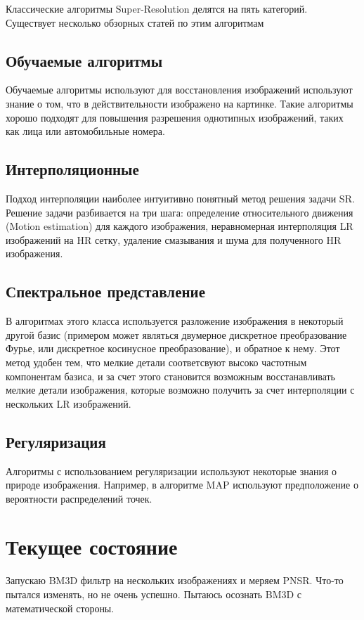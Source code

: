Классические алгоритмы Super-Resolution делятся на пять категорий.
Существует несколько обзорных статей по этим алгоритмам \cite{ParkS.C.2003,TianJ.2011}


\subsection{Обучаемые алгоритмы}

Обучаемые алгоритмы используют для восстановления изображений используют
знание о том, что в действительности изображено на картинке. Такие
алгоритмы хорошо подходят для повышения разрешения однотипных изображений,
таких как лица или автомобильные номера.


\subsection{Интерполяционные}

Подход интерполяции наиболее интуитивно понятный метод решения задачи
SR. Решение задачи разбивается на три шага: определение относительного
движения (Motion estimation) для каждого изображения, неравномерная
интерполяция LR изображений на HR сетку, удаление смазывания и шума
для полученного HR изображения.


\subsection{Спектральное представление}

В алгоритмах этого класса используется разложение изображения в некоторый
другой базис (примером может являться двумерное дискретное преобразование
Фурье, или дискретное косинусное преобразование), и обратное к нему.
Этот метод удобен тем, что мелкие детали соответсвуют высоко частотным
компонентам базиса, и за счет этого становится возможным восстанавливать
мелкие детали изображения, которые возможно получить за счет интерполяции
с нескольких LR изображений.


\subsection{Регуляризация}

Алгоритмы с использованием регуляризации используют некоторые знания
о природе изображения. Например, в алгоритме MAP используют предположение
о вероятности распределений точек.


\section{Текущее состояние}

Запускаю BM3D фильтр на нескольких изображениях и меряем PNSR. Что-то
пытался изменять, но не очень успешно. Пытаюсь осознать BM3D с математической
стороны.

\newpage{}

\begin{comment}
\phantomsection\addcontentsline{toc}{section}{\refname}\nocite{*}



\end{comment}
